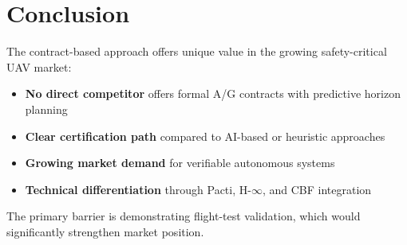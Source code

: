 \section{Conclusion}

The contract-based approach offers unique value in the growing safety-critical UAV market:

\begin{itemize}
    \item \textbf{No direct competitor} offers formal A/G contracts with predictive horizon planning
    \item \textbf{Clear certification path} compared to AI-based or heuristic approaches
    \item \textbf{Growing market demand} for verifiable autonomous systems
    \item \textbf{Technical differentiation} through Pacti, H-$\infty$, and CBF integration
\end{itemize}

The primary barrier is demonstrating flight-test validation, which would significantly strengthen market position.

